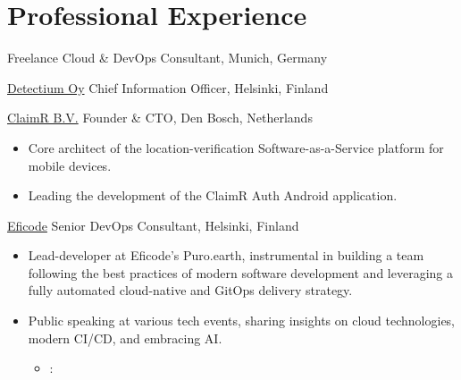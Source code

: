 \section{Professional Experience}{


     {\color{blue}{Sole Practitioner}} %
     {Freelance Cloud \& DevOps Consultant,}
     {Munich, Germany}
     {}{}
     {\vspace{.5em}}

     {\color{blue}\href{https://detectium.io}{Detectium Oy}} %
     {Chief Information Officer,}
     {Helsinki, Finland}
     {}{}
     {\vspace{.5em}}

     {{\color{blue}\href{https://claimr.tools}{ClaimR B.V.}}}
     {Founder \& CTO,}
     {Den Bosch, Netherlands}
     {}{}
     {
     	\begin{itemize}[leftmargin=0.6cm, label={\textbullet}]
     		\item Core architect of the {} location-verification Software-as-a-Service platform for mobile devices. 
     		\item Leading the development of the ClaimR Auth Android application.
     	\end{itemize}
     }
     
     {{\color{blue}\href{https://eficode.com}{Eficode}}}
     {Senior DevOps Consultant,}
     {Helsinki, Finland}
     {}{}
     {
     	\begin{itemize}[leftmargin=0.6cm, label={\textbullet}]	       		      		    
     		\item Lead-developer at Eficode's {} Puro.earth, instrumental in building a team following the best practices of modern software development and leveraging a fully automated cloud-native and GitOps delivery strategy.
            
     		\item Public speaking at various tech events, sharing insights on cloud technologies, modern CI/CD, and embracing AI.
     		      \begin{itemize}
     		      	\item 
        :
    

\end{itemize}
\end{itemize}}}
